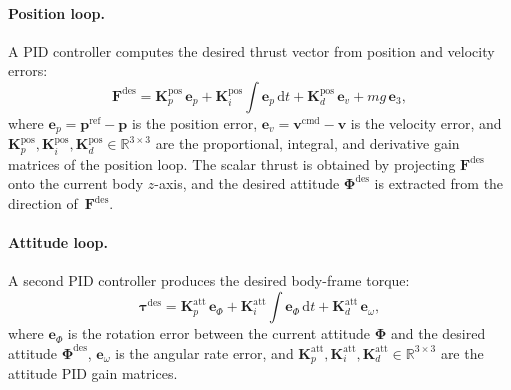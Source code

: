\paragraph{Position loop.}
A PID controller computes the desired thrust vector from position and velocity
errors:
\begin{equation}
  \mathbf{F}^{\mathrm{des}} =
    \mathbf{K}_p^{\mathrm{pos}}\,\mathbf{e}_{p}
    + \mathbf{K}_i^{\mathrm{pos}}\!\int\!\mathbf{e}_{p}\,\mathrm{d}t
    + \mathbf{K}_d^{\mathrm{pos}}\,\mathbf{e}_{v}
    + mg\,\mathbf{e}_3,
  \label{eq:pid_pos}
\end{equation}
where $\mathbf{e}_{p} = \mathbf{p}^{\mathrm{ref}} - \mathbf{p}$ is the
position error, $\mathbf{e}_{v} = \mathbf{v}^{\mathrm{cmd}} - \mathbf{v}$ is
the velocity error, and
$\mathbf{K}_p^{\mathrm{pos}}, \mathbf{K}_i^{\mathrm{pos}},
\mathbf{K}_d^{\mathrm{pos}} \in \mathbb{R}^{3 \times 3}$ are the
proportional, integral, and derivative gain matrices of the position loop.
The scalar thrust is obtained by projecting $\mathbf{F}^{\mathrm{des}}$ onto
the current body $z$-axis, and the desired attitude
$\boldsymbol{\Phi}^{\mathrm{des}}$ is extracted from the direction
of~$\mathbf{F}^{\mathrm{des}}$.

\paragraph{Attitude loop.}
A second PID controller produces the desired body-frame torque:
\begin{equation}
  \boldsymbol{\tau}^{\mathrm{des}} =
    \mathbf{K}_p^{\mathrm{att}}\,\mathbf{e}_{\Phi}
    + \mathbf{K}_i^{\mathrm{att}}\!\int\!\mathbf{e}_{\Phi}\,\mathrm{d}t
    + \mathbf{K}_d^{\mathrm{att}}\,\mathbf{e}_{\omega},
  \label{eq:pid_att}
\end{equation}
where $\mathbf{e}_{\Phi}$ is the rotation error between the current attitude
$\boldsymbol{\Phi}$ and the desired attitude
$\boldsymbol{\Phi}^{\mathrm{des}}$,
$\mathbf{e}_{\omega}$ is the angular rate error, and
$\mathbf{K}_p^{\mathrm{att}}, \mathbf{K}_i^{\mathrm{att}},
\mathbf{K}_d^{\mathrm{att}} \in \mathbb{R}^{3 \times 3}$ are the attitude PID
gain matrices.

